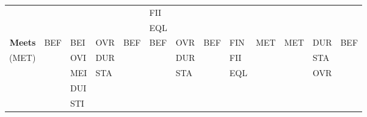 \documentclass[11pt]{report}
\newenvironment{vvarmargin}[2]
{
  \begin{list}{}
  {
    \setlength{\topsep}{0pt}
    \setlength{\leftmargin}{0pt}
    \setlength{\rightmargin}{0pt}
    \setlength{\listparindent}{\parindent}
    \setlength{\itemindent}{\parindent}
    \setlength{\parsep}{0pt plus 1pt}
    \addtolength{\leftmargin}{#1}\addtolength{\rightmargin}{#2}
  }
  \item
}
{
  \end{list}
}
\begin{document}
\begin{table}[p]
\begin{vvarmargin}{-4cm}{-4cm}
\begin{center}
\begin{tabular}[t]{|r|l|l|l|l|l|l|l|l|l|l|l|l|}
                                          &                         &                         &                         &                         & FII                     &                         &                         &                         &                         &                         &                         &                         \\
                                          &                         &                         &                         &                         & EQL                     &                         &                         &                         &                         &                         &                         &                         \\
                  \hline
                  \textbf{Meets}          & BEF                     & BEI                     & OVR                     & BEF                     & BEF                     & OVR                     & BEF                     & FIN                     & MET                     & MET                     & DUR                     & BEF                     \\
                  (MET)                   &                         & OVI                     & DUR                     &                         &                         & DUR                     &                         & FII                     &                         &                         & STA                     &                         \\
                                          &                         & MEI                     & STA                     &                         &                         & STA                     &                         & EQL                     &                         &                         & OVR                     &                         \\
                                          &                         & DUI                     &                         &                         &                         &                         &                         &                         &                         &                         &                         &                         \\
                                          &                         & STI                     &                         &                         &                         &                         &                         &                         &                         &                         &                         &                         \\

\end{tabular}
\end{center}
\end{vvarmargin}
\end{table}
\end{document}
